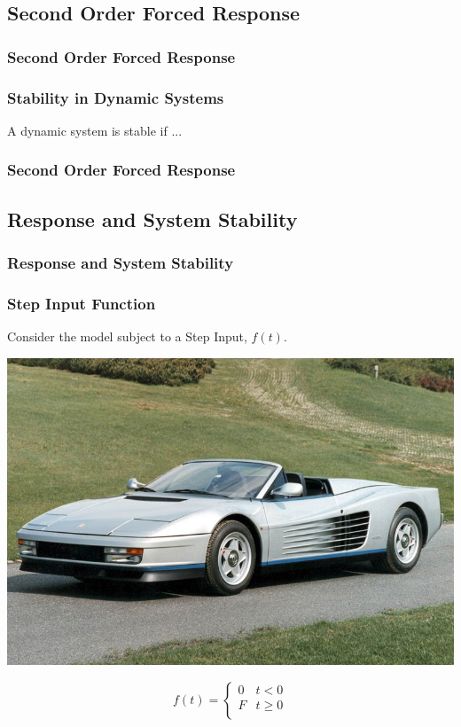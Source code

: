 \documentclass[fleqn]{beamer} %
\newcommand{\sectionIsubsectionIItitle}{Second Order Forced Response}
\newcommand{\sectionIsubsectionIIItitle}{Response and System Stability}
\begin{document}
		
		\subsection{\sectionIsubsectionIItitle}\label{sectionIsubsectionII}

			\begin{frame}
				\frametitle{\sectionIsubsectionIItitle}
				\bigskip

				\frametitle{Stability in Dynamic Systems}

				A dynamic system is stable if ...  \vspace{50mm}\\

				\btVFill
			\end{frame}

			\begin{frame}
				\frametitle{\sectionIsubsectionIItitle}
				\bigskip

				\btVFill
			\end{frame}


		\subsection{\sectionIsubsectionIIItitle}\label{sectionIsubsectionIII}
			\begin{frame} 
				\frametitle{\sectionIsubsectionIIItitle}
				\bigskip

				\frametitle{Step Input Function}

				\Large Consider the model subject to a Step Input, $f(t)$. \vspace{3mm}\\
				\begin{multicols}{2}
				\includegraphics[scale=.15]{images/ferrari.jpg}  

				\scalebox{1.25}{$m\dot{v} +cv=f(t)$} 

				\[f(t) = \begin{cases} 
				      0 & t < 0 \\
				      F & t\geq 0 \\
				   \end{cases}
				\]

				\end{multicols}


				\btVFill
			\end{frame}	
\end{document}
